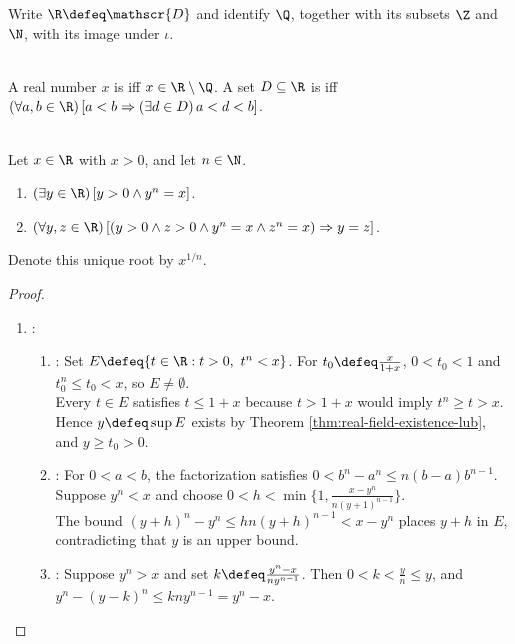 Write $\R\defeq\mathscr{D}$ and identify $\Q$, together with its subsets $\Z$ and $\N$, with its image under $\iota$.

\begin{definition} \label{def:irrational-and-dense-subsets-real-line} \\
A real number $x$ is  iff $x\in\R\setminus\Q$. A set $D\subseteq\R$ is  iff $(\forall a,b\in\R)\,[a<b\Rightarrow(\exists d\in D)\,a<d<b]$.
\end{definition}

\begin{theorem} \label{thm:nth-roots-positive-reals} \\
Let $x\in\R$ with $x>0$, and let $n\in\N$.
\begin{enumerate}[label=(\roman*)]
\setlength{\itemsep}{0pt}
\item $(\exists y\in\R)\,[y>0\land y^n=x]$.
\item $(\forall y,z\in\R)\,[(y>0\land z>0\land y^n=x\land z^n=x)\Rightarrow y=z]$.
\end{enumerate}
Denote this unique root by $x^{1/n}$.
\begin{proof}
\begin{enumerate}[label=(\roman*)]
\setlength{\itemsep}{0pt}
\item {}:
\begin{enumerate}[label=(\alph*)]
\setlength{\itemsep}{0pt}
\item {}: Set $E\defeq\{t\in\R:t>0,\ t^n<x\}$. For $t_0\defeq\frac{x}{1+x}$, $0<t_0<1$ and $t_0^n\leq t_0<x$, so $E\neq\emptyset$.\\
Every $t\in E$ satisfies $t\leq1+x$ because $t>1+x$ would imply $t^n\geq t>x$.\\
Hence $y\defeq\sup E$ exists by Theorem \ref{thm:real-field-existence-lub}, and $y\geq t_0>0$.
\item {}: For $0<a<b$, the factorization satisfies $0<b^n-a^n\leq n(b-a)b^{n-1}$.\\
Suppose $y^n<x$ and choose $0<h<\min\{1,\frac{x-y^n}{n(y+1)^{n-1}}\}$.\\
The bound $(y+h)^n-y^n\leq hn(y+h)^{n-1}<x-y^n$ places $y+h$ in $E$, contradicting that $y$ is an upper bound.
\item {}: Suppose $y^n>x$ and set $k\defeq\frac{y^n-x}{ny^{n-1}}$. Then $0<k<\frac{y}{n}\leq y$, and $y^n-(y-k)^n\leq kny^{n-1}=y^n-x$.\\

\end{enumerate}
\end{enumerate}
\end{proof}
\end{theorem}
